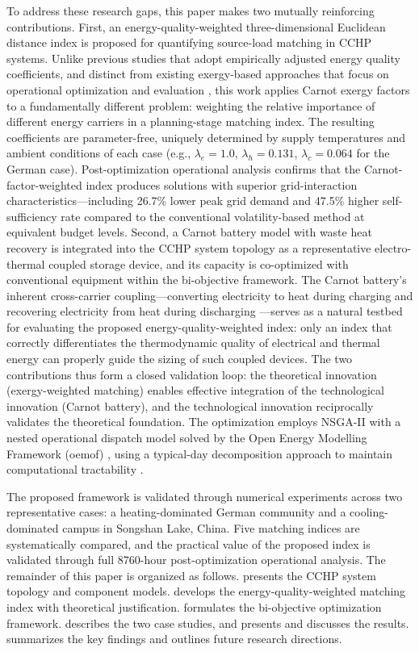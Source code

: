 To address these research gaps, this paper makes two mutually reinforcing contributions. First, an energy-quality-weighted three-dimensional Euclidean distance index is proposed for quantifying source-load matching in CCHP systems. Unlike previous studies that adopt empirically adjusted energy quality coefficients, and distinct from existing exergy-based approaches that focus on operational optimization and evaluation \cite{li2022exergyflow,chen2024joint,ma2023exergyflex}, this work applies Carnot exergy factors to a fundamentally different problem: weighting the relative importance of different energy carriers in a planning-stage matching index. The resulting coefficients are parameter-free, uniquely determined by supply temperatures and ambient conditions of each case (e.g., $\lambda_e = 1.0$, $\lambda_h = 0.131$, $\lambda_c = 0.064$ for the German case). Post-optimization operational analysis confirms that the Carnot-factor-weighted index produces solutions with superior grid-interaction characteristics---including 26.7\% lower peak grid demand and 47.5\% higher self-sufficiency rate compared to the conventional volatility-based method at equivalent budget levels. Second, a Carnot battery model with waste heat recovery is integrated into the CCHP system topology as a representative electro-thermal coupled storage device, and its capacity is co-optimized with conventional equipment within the bi-objective framework. The Carnot battery's inherent cross-carrier coupling---converting electricity to heat during charging and recovering electricity from heat during discharging \cite{zhao2024cbthermo}---serves as a natural testbed for evaluating the proposed energy-quality-weighted index: only an index that correctly differentiates the thermodynamic quality of electrical and thermal energy can properly guide the sizing of such coupled devices. The two contributions thus form a closed validation loop: the theoretical innovation (exergy-weighted matching) enables effective integration of the technological innovation (Carnot battery), and the technological innovation reciprocally validates the theoretical foundation. The optimization employs NSGA-II with a nested operational dispatch model solved by the Open Energy Modelling Framework (oemof) \cite{hilpert2018oemof}, using a typical-day decomposition approach to maintain computational tractability \cite{kotzur2018impact,dominguez2012selection}.

The proposed framework is validated through numerical experiments across two representative cases: a heating-dominated German community and a cooling-dominated campus in Songshan Lake, China. Five matching indices are systematically compared, and the practical value of the proposed index is validated through full 8760-hour post-optimization operational analysis. The remainder of this paper is organized as follows.  presents the CCHP system topology and component models.  develops the energy-quality-weighted matching index with theoretical justification.  formulates the bi-objective optimization framework.  describes the two case studies, and  presents and discusses the results.  summarizes the key findings and outlines future research directions.
